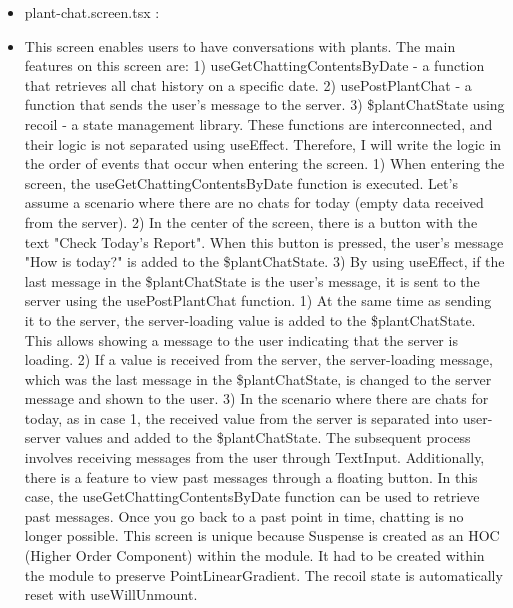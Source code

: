 \documentclass[conference, a4paper]{IEEEtran}
\begin{document}
\begin{enumerate}
\begin{enumerate}
\begin{itemize}
        \item plant-chat.screen.tsx : 
        \item[] This screen enables users to have conversations with plants. The main features on this screen are: 1) useGetChattingContentsByDate - a function that retrieves all chat history on a specific date. 2) usePostPlantChat - a function that sends the user's message to the server. 3) \$plantChatState using recoil - a state management library. These functions are interconnected, and their logic is not separated using useEffect. Therefore, I will write the logic in the order of events that occur when entering the screen. 1) When entering the screen, the useGetChattingContentsByDate function is executed. Let's assume a scenario where there are no chats for today (empty data received from the server). 2) In the center of the screen, there is a button with the text "Check Today's Report". When this button is pressed, the user's message "How is today?" is added to the \$plantChatState. 3) By using useEffect, if the last message in the \$plantChatState is the user's message, it is sent to the server using the usePostPlantChat function. 1) At the same time as sending it to the server, the server-loading value is added to the \$plantChatState. This allows showing a message to the user indicating that the server is loading. 2) If a value is received from the server, the server-loading message, which was the last message in the \$plantChatState, is changed to the server message and shown to the user. 3) In the scenario where there are chats for today, as in case 1, the received value from the server is separated into user-server values and added to the \$plantChatState. The subsequent process involves receiving messages from the user through TextInput. Additionally, there is a feature to view past messages through a floating button. In this case, the useGetChattingContentsByDate function can be used to retrieve past messages. Once you go back to a past point in time, chatting is no longer possible. This screen is unique because Suspense is created as an HOC (Higher Order Component) within the module. It had to be created within the module to preserve PointLinearGradient. The recoil state is automatically reset with useWillUnmount. \\


\end{itemize}
\end{enumerate}
\end{enumerate}
\end{document}
